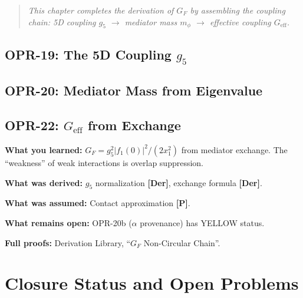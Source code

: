 \documentclass[11pt,a4paper]{book}
\theoremstyle{definition}
\theoremstyle{remark}
\newcommand{\tagDer}{\textcolor{derivedColor}{\textbf{[Der]}}}
\newcommand{\tagP}{\textcolor{postulatedColor}{\textbf{[P]}}}
\begin{document}
\begin{quote}
\textit{This chapter completes the derivation of $G_F$ by assembling the coupling
chain: 5D coupling $g_5$ $\to$ mediator mass $m_\phi$ $\to$ effective coupling
$G_{\text{eff}}$.}
\end{quote}

\section{OPR-19: The 5D Coupling $g_5$}
\label{sec:opr19}



\section{OPR-20: Mediator Mass from Eigenvalue}
\label{sec:opr20}



\section{OPR-22: $G_{\text{eff}}$ from Exchange}
\label{sec:opr22}



\begin{chapterRecap}
\textbf{What you learned:} $G_F = g_5^2 |f_1(0)|^2 / (2 x_1^2)$ from mediator exchange.
The ``weakness'' of weak interactions is overlap suppression.

\textbf{What was derived:} $g_5$ normalization \tagDer{}, exchange formula \tagDer{}.

\textbf{What was assumed:} Contact approximation \tagP{}.

\textbf{What remains open:} OPR-20b ($\alpha$ provenance) has YELLOW status.

\textbf{Full proofs:} Derivation Library, ``$G_F$ Non-Circular Chain''.
\end{chapterRecap}

\chapter{Closure Status and Open Problems}
\label{ch:closure_status}
\end{document}
